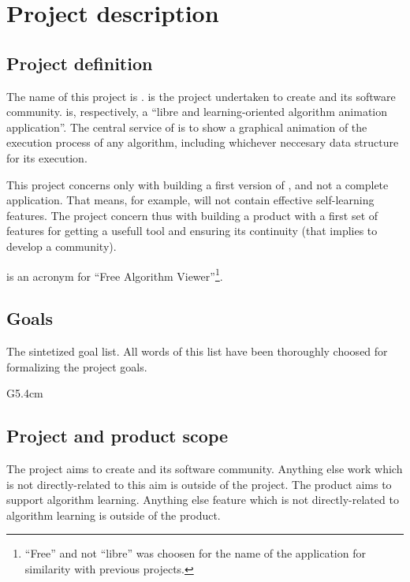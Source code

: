 \documentclass[twocolumn]{article}
\begin{document}
\section{Project description}
\subsection{Project definition}
The name of this project is \favp. \favp is the project undertaken to
create \fav and its software community. \fav is, respectively, a
``libre and learning-oriented algorithm animation application''. The
central service of \fav is to show a graphical animation of the execution
process of any algorithm, including whichever neccesary data structure
for its execution.

This project concerns only with building a first version of \fav, and
not a complete application. That means, for example, \fav will not
contain effective self-learning features. The project concern thus
with building a product with a first set of features for getting a
usefull tool and ensuring its continuity (that implies to develop a
community).

\fav is an acronym for ``Free Algorithm Viewer''\footnote{``Free'' and
not ``libre'' was choosen for the name of the application for similarity
with previous projects.}.

\subsection{Goals}
\label{sec:goals}
The sintetized \favp goal list. All words of this list
have been thoroughly choosed for formalizing the project goals.

\begin{condlist}{G}{5.4cm}
\end{condlist}

\subsection{Project and product scope}
The project aims to create \fav and its software community. Anything
else work which is not directly-related to this aim is outside of the
project. The product aims to support algorithm learning. Anything else
feature which is not directly-related to algorithm learning is
outside of the product.
\end{document}
